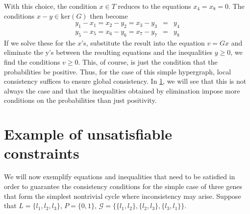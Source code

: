 With this choice, the condition $x \in T$ reduces to the equations
$x_4 = x_8 = 0$.  The conditions $x - y \in \mathrm{ker}(G)$ then
become
\begin{eqnarray}
 y_1 - x_1 = x_2 - y_2 = x_3 - y_3 &=& y_4 \\
 y_5 - x_5 = x_6 - y_6 = x_7 - y_7 &=& y_8
\end{eqnarray}
If we solve these for the $x$'s, substitute the result into the
equation $v = Gx$ and eliminate the y's between the resulting
equations and the inequalities $y \ge 0$, we find the conditions $v
\ge 0$.  This, of course, is just the condition that the probabilities
be positive.  Thus, for the case of this simple hypergraph, local
consistency suffices to ensure global consistency.  In \ref{sec:inconsistency},
we will see that this is not always the case and that the
inequalities obtained by elimination impose more conditions on the
probabilities than just positivity.

\section{Example of unsatisfiable constraints}\label{sec:inconsistency}
We will now exemplify equations and inequalities that need to be satisfied in order to guarantee the consistency conditions for the simple case of three genes that form the simplest nontrivial cycle where inconsistency may arise. Suppose that $L = \{l_1,l_2,l_3\}$, $P = \{0,1\}$, $\mathcal{G} = \{\{l_1,l_2\},\{l_2,l_3\},\{l_3,l_1\}\}$.

